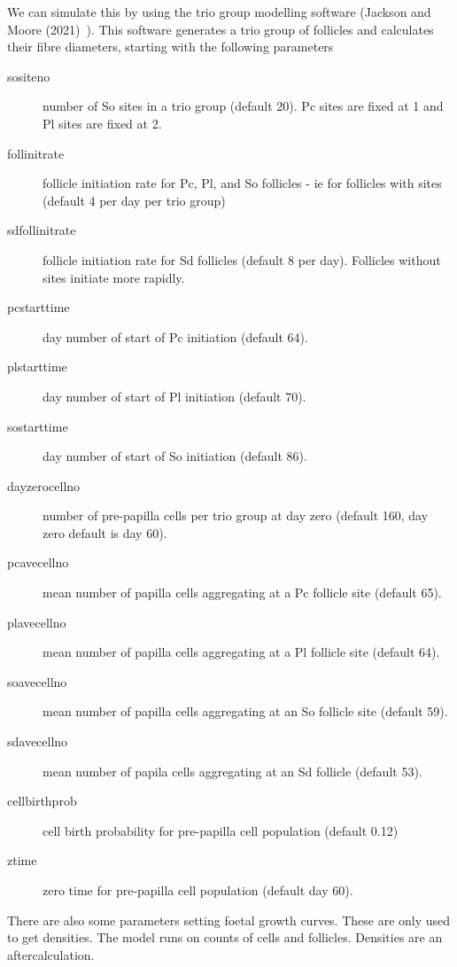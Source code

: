 \documentclass[titlepage]{article}  %
\begin{document}
We can simulate this by using the trio group modelling software (Jackson and Moore (2021)~\cite{jack:21}). This software generates a trio group of follicles and calculates their fibre diameters, starting with the following parameters
\begin{description}
\item[sositeno] number of So sites in a trio group (default 20). Pc sites are fixed at 1 and Pl sites are fixed at 2. 
\item[follinitrate] follicle initiation rate for Pc, Pl, and So follicles - ie for follicles with sites (default 4 per day per trio group)
\item[sdfollinitrate] follicle initiation rate for Sd follicles (default 8 per day). Follicles without sites initiate more rapidly.
\item[pcstarttime] day number of start of Pc initiation (default 64). 
\item[plstarttime] day number of start of Pl initiation (default 70).
\item[sostarttime] day number of start of So initiation (default 86).
\item[dayzerocellno] number of pre-papilla cells per trio group  at day zero (default 160, day zero default is day 60).
\item[pcavecellno] mean number of papilla cells aggregating at a Pc follicle site (default 65).
\item[plavecellno] mean number of papilla cells aggregating at a Pl follicle site (default 64).
\item[soavecellno] mean number of papilla cells aggregating at an So follicle site (default 59).
\item[sdavecellno] mean number of papila cells aggregating at an Sd follicle (default 53).
\item[cellbirthprob] cell birth probability for pre-papilla cell population (default 0.12)
\item[ztime] zero time for pre-papilla cell population (default day 60). 
\end{description}

There are also some parameters setting foetal growth curves. These are only used to get densities. The model runs on counts of cells and follicles. Densities are an aftercalculation.
\end{document}
